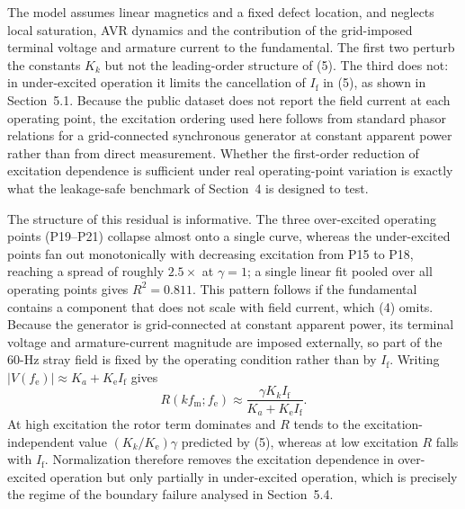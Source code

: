 The model assumes linear magnetics and a fixed defect location, and neglects local
saturation, AVR dynamics and the contribution of the grid-imposed terminal voltage and
armature current to the fundamental. The first two perturb the constants $K_k$ but not the
leading-order structure of (5). The third does not: in under-excited operation it limits
the cancellation of $I_\mathrm{f}$ in (5), as shown in Section~5.1. Because the public
dataset does not report the field current at each operating point, the excitation ordering
used here follows from standard phasor relations for a grid-connected synchronous generator
at constant apparent power rather than from direct measurement. Whether the first-order
reduction of excitation dependence is sufficient under real operating-point variation is
exactly what the leakage-safe benchmark of Section~4 is designed to test.


The structure of this residual is informative. The three over-excited operating points
(P19--P21) collapse almost onto a single curve, whereas the under-excited points fan out
monotonically with decreasing excitation from P15 to P18, reaching a spread of roughly
$2.5\times$ at $\gamma = 1$; a single linear fit pooled over all operating points gives
$R^2 = 0.811$. This pattern follows if the fundamental contains a component that does not
scale with field current, which (4) omits. Because the generator is grid-connected at
constant apparent power, its terminal voltage and armature-current magnitude are imposed
externally, so part of the 60-Hz stray field is fixed by the operating condition rather
than by $I_\mathrm{f}$. Writing $|V(f_\mathrm{e})| \approx K_a + K_\mathrm{e} I_\mathrm{f}$
gives
\[
  R(kf_\mathrm{m}; f_\mathrm{e}) \approx
  \frac{\gamma K_k I_\mathrm{f}}{K_a + K_\mathrm{e} I_\mathrm{f}} .
\]
At high excitation the rotor term dominates and $R$ tends to the excitation-independent
value $(K_k/K_\mathrm{e})\gamma$ predicted by (5), whereas at low excitation $R$ falls with
$I_\mathrm{f}$. Normalization therefore removes the excitation dependence in over-excited
operation but only partially in under-excited operation, which is precisely the regime of
the boundary failure analysed in Section~5.4.


